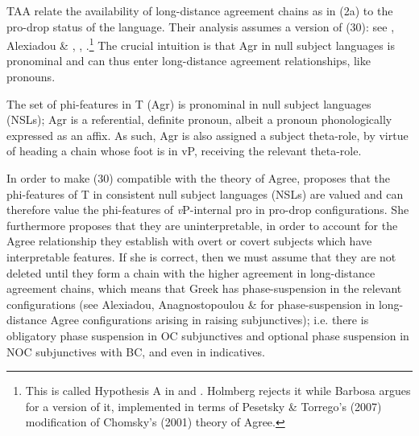 \documentclass[output=paper]{langsci/langscibook}
\begin{document}
\begin{exe}%
    \z
\end{exe}


TAA relate the availability of long-distance agreement chains as in (2a) to the pro-drop status of the language. Their analysis assumes a version of (30): see \citet{Rizzi1982}, Alexiadou \& \citet{Anagnostopoulou1998}, \citet{Holmberg2005}, \citet{Barbosa2009}.\footnote{This is called Hypothesis A in \citet{Holmberg2005} and \citet{Barbosa2009}. Holmberg rejects it while Barbosa argues for a version of it, implemented in terms of Pesetsky \& Torrego’s (2007) modification of Chomsky’s (2001) theory of Agree.} The crucial intuition is that Agr in null subject languages is pronominal and can thus enter long-distance agreement relationships, like pronouns.

\ea%
    \label{ex:alexiadou:30}
    The set of phi-features in T (Agr) is pronominal in null subject languages (NSLs); Agr is a referential, definite pronoun, albeit a pronoun phonologically expressed as an affix. As such, Agr is also assigned a subject theta-role, by virtue of heading a chain whose foot is in vP, receiving the relevant theta-role.
    \z

          

In order to make (30) compatible with the theory of Agree, \citet{Barbosa2009} proposes that the phi-features of T in consistent null subject languages (NSLs) are valued and can therefore value the phi-features of \textit{v}P-internal pro in pro-drop configurations. She furthermore proposes that they are uninterpretable, in order to account for the Agree relationship they establish with overt or covert subjects which have interpretable features. If she is correct, then we must assume that they are not deleted until they form a chain with the higher agreement in long-distance agreement chains, which means that Greek has phase-suspension in the relevant configurations (see Alexiadou, Anagnostopoulou \& \citealt{Wurmbrand2014} for phase-suspension in long-distance Agree configurations arising in raising subjunctives); i.e. there is obligatory phase suspension in OC subjunctives and optional phase suspension in NOC subjunctives with BC, and even in indicatives.  
\end{document}
